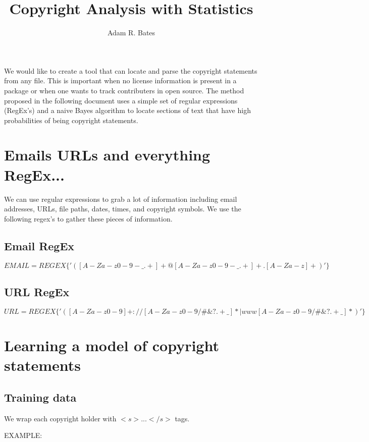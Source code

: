 \documentclass[10pt,a4paper]{article}
\title{Copyright Analysis with Statistics}
\author{Adam R. Bates}
\begin{document}
\maketitle

We would like to create a tool that can locate and parse the copyright statements from any file. This is important when no license information is present in a package or when one wants to track contributers in open source. The method proposed in the following document uses a simple set of regular expressions (RegEx's) and a naive Bayes algorithm to locate sections of text that have high probabilities of being copyright statements.

\section{Emails URLs and everything RegEx...}
We can use regular expressions to grab a lot of information including email addresses, URLs, file paths, dates, times, and copyright symbols. We use the following regex's to gather these pieces of information.

\subsection{Email RegEx}
$EMAIL = REGEX\{'([A-Za-z0-9-\_.+]+@[A-Za-z0-9-\_.+]+.[A-Za-z]+)'\}$
\subsection{URL RegEx}
$URL = REGEX\{'([A-Za-z0-9]+://[A-Za-z0-9/\#\&?.+\_]*|www[A-Za-z0-9/\#\&?.+\_]*)'\}$

\section{Learning a model of copyright statements}

\subsection{Training data}
We wrap each copyright holder with $<s>...</s>$ tags. 

EXAMPLE:
\end{document}
